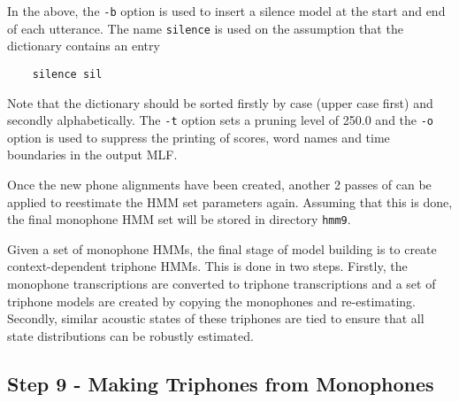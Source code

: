 In the above, the \texttt{-b} option is used to insert a silence model
at the start and end of each utterance.  The name \texttt{silence} is used
on the assumption that the dictionary contains an entry
\begin{verbatim}
    silence sil
\end{verbatim}
Note that the dictionary should be sorted firstly by case (upper case first) and secondly 
alphabetically.  The \texttt{-t} option sets a pruning level of 250.0 and the \texttt{-o} 
option is used to suppress the printing of scores, word names and time
boundaries in the output MLF.


Once the new phone alignments have been created, another  2 passes
of  can be applied to reestimate the HMM set parameters
again.  Assuming that this is done, the final monophone HMM set will
be stored in directory \texttt{hmm9}.


Given a set of monophone HMMs, the final stage of model building is to create
context-dependent triphone HMMs.  This is done in 
two steps.  Firstly, the
monophone transcriptions are converted to triphone transcriptions and a set
of triphone models are created by copying the monophones and re-estimating.
Secondly, similar acoustic states of these triphones are tied to ensure that
all state distributions can be robustly estimated.

\subsection{Step 9 - Making Triphones from Monophones}


